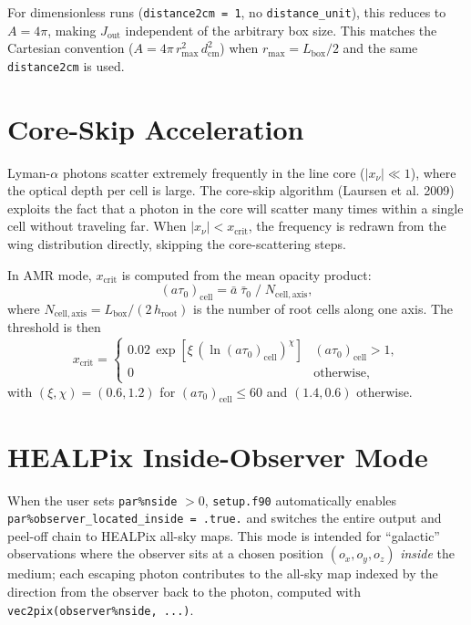 \documentclass[english,a4paper]{my_memo}
\begin{document}
For dimensionless runs (\texttt{distance2cm = 1}, no \texttt{distance\_unit}),
this reduces to $A = 4\pi$, making $J_\mathrm{out}$ independent of the
arbitrary box size.  This matches the Cartesian convention
($A = 4\pi\,r_\mathrm{max}^2\,d_\mathrm{cm}^2$) when
$r_\mathrm{max} = L_\mathrm{box}/2$ and the same \texttt{distance2cm} is used.

\section{Core-Skip Acceleration}

Lyman-$\alpha$ photons scatter extremely frequently in the line core
($|x_\nu| \ll 1$), where the optical depth per cell is large.  The
core-skip algorithm (Laursen et al. 2009) exploits the fact that a photon in
the core will scatter many times within a single cell without traveling far.
When $|x_\nu| < x_\mathrm{crit}$, the frequency is redrawn from the
wing distribution directly, skipping the core-scattering steps.

In AMR mode, $x_\mathrm{crit}$ is computed from the mean opacity product:
\begin{equation}
  (a\tau_0)_\mathrm{cell}
    = \bar{a}\;\bar\tau_0\;/\;N_\mathrm{cell,axis},
\end{equation}
where $N_\mathrm{cell,axis} = L_\mathrm{box} / (2\,h_\mathrm{root})$ is the
number of root cells along one axis.  The threshold is then
\begin{equation}
  x_\mathrm{crit} =
  \begin{cases}
    0.02\,\exp\!\left[\xi\,(\ln(a\tau_0)_\mathrm{cell})^\chi\right] &
      (a\tau_0)_\mathrm{cell} > 1, \\
    0 & \text{otherwise},
  \end{cases}
\end{equation}
with $(\xi, \chi) = (0.6, 1.2)$ for $(a\tau_0)_\mathrm{cell} \le 60$ and
$(1.4, 0.6)$ otherwise.

\section{HEALPix Inside-Observer Mode}

When the user sets \texttt{par\%nside} $> 0$, \texttt{setup.f90} automatically
enables \texttt{par\%observer\_located\_inside = .true.} and switches the
entire output and peel-off chain to HEALPix all-sky maps.  This mode is
intended for ``galactic'' observations where the observer sits at a chosen
position $(o_x, o_y, o_z)$ \emph{inside} the medium; each escaping photon
contributes to the all-sky map indexed by the direction from the observer
back to the photon, computed with \texttt{vec2pix(observer\%nside, ...)}.
\end{document}
